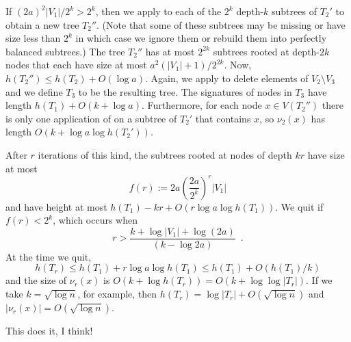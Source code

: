 \documentclass[kpfonts]{patmorin}
\begin{document}
If $(2a)^2|V_1|/2^k > 2^k$, then we apply  to each of the $2^k$ depth-$k$ subtrees of $T_2'$ to obtain a new tree $T_2''$.  (Note that some of these subtrees may be missing or have size less than $2^k$ in which case we ignore them or rebuild them into perfectly balanced subtrees.)  The tree $T_2''$ has at most $2^{2k}$ subtrees rooted at depth-$2k$ nodes that each have size at most $a^2(|V_1|+1)/2^{2k}$. Now, $h(T_2'')\le h(T_2)+O(\log a)$. Again, we apply  to delete elements of $V_2\setminus V_3$ and we define $T_3$ to be the resulting tree.  The signatures of nodes in $T_3$ have length $h(T_1)+O(k+\log a)$.  Furthermore, for each node $x\in V(T_2'')$ there is only one application of  on a subtree of $T_2'$ that contains $x$, so $\nu_2(x)$ has length $O(k+\log a\log h(T_2'))$.

After $r$ iterations of this kind, the subtrees rooted at nodes of depth $kr$ have size at most
\[
     f(r) := 2a\left(\frac{2a}{2^k}\right)^r|V_1|
\]
and have height at most $h(T_1)-kr+O(r\log a\log h(T_1))$.  We quit if $f(r)<2^k$, which occurs when
\[
   r > \frac{k + \log |V_1| + \log(2a)}{(k-\log 2a)} \enspace .
\]
At the time we quit, 
\[
   h(T_r) \le h(T_1)+r\log a\log h(T_1) \le h(T_1) + O(h(T_1)/k)
\]
and the size of $\nu_r(x)$ is $O(k+\log h(T_r))=O(k+\log\log |T_r|)$.  
If we take $k=\sqrt{\log n}$, for example, then $h(T_r)=\log |T_r|+O(\sqrt{\log n})$ and $|\nu_r(x)|=O(\sqrt{\log n})$.

This does it, I think!





% 
% 
% 
\end{document}
